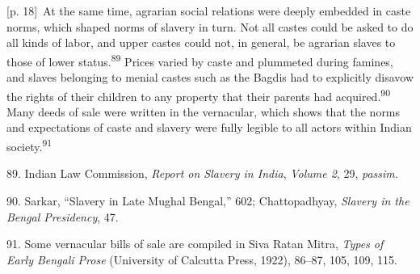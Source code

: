 \documentclass[10pt,a4paper]{article}
\begin{document}
{\scriptsize\color{gray} [p. 18]}\ At the same time, agrarian social relations were deeply embedded in caste norms, which shaped norms of slavery in turn. Not all castes could be asked to do all kinds of labor, and upper castes could not, in general, be agrarian slaves to those of lower status.\nobreak\textsuperscript{89} Prices varied by caste and plummeted during famines, and slaves belonging to menial castes such as the Bagdis had to explicitly disavow the rights of their children to any property that their parents had acquired.\nobreak\textsuperscript{90} Many deeds of sale were written in the vernacular, which shows that the norms and expectations of caste and slavery were fully legible to all actors within Indian society.\nobreak\textsuperscript{91}\par{\small 89. Indian Law Commission, \textit{Report on Slavery in India}, \textit{Volume 2}, 29, \textit{passim.}\par}{\small 90. Sarkar, “Slavery in Late Mughal Bengal,” 602; Chattopadhyay, \textit{Slavery in the Bengal Presidency}, 47.\par}{\small 91. Some vernacular bills of sale are compiled in Siva Ratan Mitra, \textit{Types of Early Bengali Prose} (University of Calcutta Press, 1922), 86–87, 105, 109, 115.\par}
\end{document}
